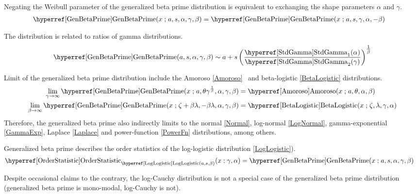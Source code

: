 

Negating the Weibull parameter of the generalized beta prime distribution is equivalent to exchanging the shape parameters  $\alpha$ and $\gamma$.
\begin{align*}
\opr{GenBetaPrime}&(x\given a, s, \alpha,\gamma,\beta)  = \opr{GenBetaPrime}(x\given a, s,\gamma, \alpha,-\beta) \checked
\end{align*}

The distribution is related to ratios of gamma distributions.
\[
\opr{GenBetaPrime}(a,s,\alpha,\gamma,\beta) \sim a+ s\left( \frac{\opr{StdGamma}_1(\alpha)}{\opr{StdGamma}_2(\gamma) } \right)^{\tfrac{1}{\beta}} \checked
\notag
\]

Limit of the generalized beta prime distribution include the Amoroso \eqref{Amoroso}~\cite{McDonald1984} and beta-logistic \eqref{BetaLogistic} distributions.
\begin{align*}
\lim_{\gamma\rightarrow\infty} \opr{GenBetaPrime}(x\given a, \theta \gamma^{\frac{1}{\beta}} ,\alpha, \gamma, \beta )  
& = \opr{Amoroso}(x\given a,\theta,\alpha, \beta) \checked \\
\lim_{\beta\rightarrow\infty}  \opr{GenBetaPrime}(x\given  \pLoc+\beta\pScale, -\beta \pScale, \alpha, \gamma, \beta)  
 & = \opr{BetaLogistic}(x\given \pLoc,\pScale, \gamma, \alpha) \checked
\end{align*}
Therefore, the generalized beta prime also indirectly limits to the normal \eqref{Normal}, log-normal \eqref{LogNormal}, gamma-exponential \eqref{GammaExp}, Laplace \eqref{Laplace} and power-function \eqref{PowerFn} distributions, among others.

Generalized beta prime describes the order statistics  of the log-logistic distribution \eqref{LogLogistic}). 
\begin{align*}
 \opr{OrderStatistic}_{\opr{LogLogistic}(a,s,\beta)}(x \given \gamma, \alpha ) & =  \opr{GenBetaPrime}(x\given a, s, \alpha, \gamma, \beta)  \checked
\end{align*}


Despite occasional claims to the contrary,%
the log-Cauchy distribution is not a special case of the generalized beta prime distribution (generalized beta prime is mono-modal, log-Cauchy is not).





